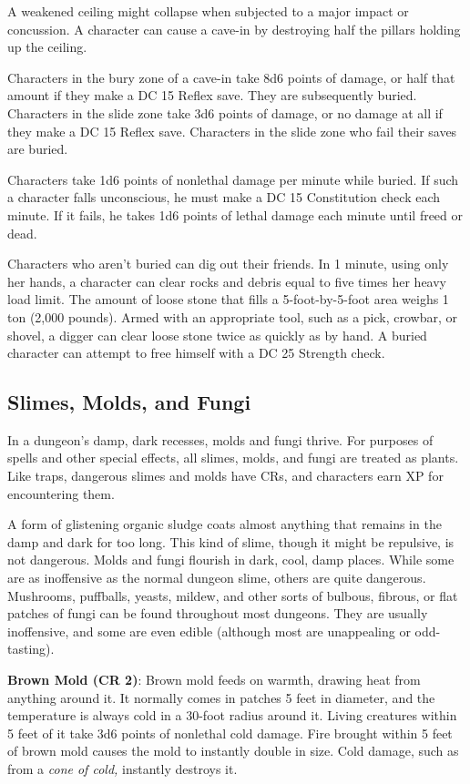 A weakened ceiling might collapse when subjected to a major impact or concussion. A character can cause a cave-in by destroying half the pillars holding up the ceiling. 
				
Characters in the bury zone of a cave-in take 8d6 points of damage, or half that amount if they make a DC 15 Reflex save. They are subsequently buried. Characters in the slide zone take 3d6 points of damage, or no damage at all if they make a DC 15 Reflex save. Characters in the slide zone who fail their saves are buried.
				
Characters take 1d6 points of nonlethal damage per minute while buried. If such a character falls unconscious, he must make a DC 15 Constitution check each minute. If it fails, he takes 1d6 points of lethal damage each minute until freed or dead.
				
Characters who aren't buried can dig out their friends. In 1 minute, using only her hands, a character can clear rocks and debris equal to five times her heavy load limit. The amount of loose stone that fills a 5-foot-by-5-foot area weighs 1 ton (2,000 pounds). Armed with an appropriate tool, such as a pick, crowbar, or shovel, a digger can clear loose stone twice as quickly as by hand. A buried character can attempt to free himself with a DC 25 Strength check.
				
\subsection{Slimes, Molds, and Fungi}

				
In a dungeon's damp, dark recesses, molds and fungi thrive. For purposes of spells and other special effects, all slimes, molds, and fungi are treated as plants. Like traps, dangerous slimes and molds have CRs, and characters earn XP for encountering them.
				
A form of glistening organic sludge coats almost anything that remains in the damp and dark for too long. This kind of slime, though it might be repulsive, is not dangerous. Molds and fungi flourish in dark, cool, damp places. While some are as inoffensive as the normal dungeon slime, others are quite dangerous. Mushrooms, puffballs, yeasts, mildew, and other sorts of bulbous, fibrous, or flat patches of fungi can be found throughout most dungeons. They are usually inoffensive, and some are even edible (although most are unappealing or odd-tasting).
				
\textbf{Brown Mold (CR 2)}: Brown mold feeds on warmth, drawing heat from anything around it. It normally comes in patches 5 feet in diameter, and the temperature is always cold in a 30-foot radius around it. Living creatures within 5 feet of it take 3d6 points of nonlethal cold damage. Fire brought within 5 feet of brown mold causes the mold to instantly double in size. Cold damage, such as from a \textit{cone of cold, }instantly destroys it.
				
